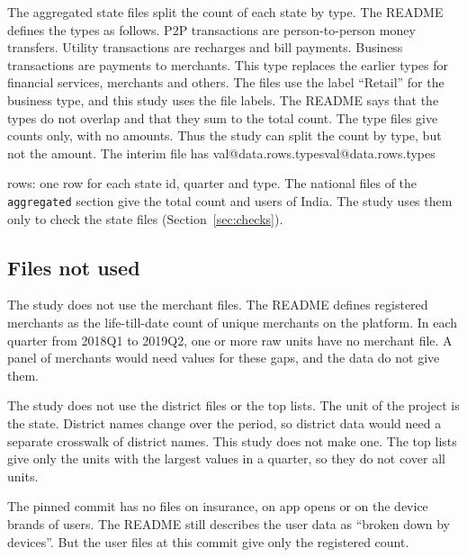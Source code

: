 \documentclass[11pt,a4paper]{article}
\makeatletter
\newcommand{\val}[1]{\ifcsname val@#1\endcsname\csname val@#1\endcsname\else
  \PackageError{study}{Unknown value key `#1'}{Run Rscript src/R/part1_study.R}\fi}
\makeatother
\begin{document}
The aggregated state files split the count of each state by type. The README defines the types as follows. P2P transactions are person-to-person money transfers. Utility transactions are recharges and bill payments. Business transactions are payments to merchants. This type replaces the earlier types for financial services, merchants and others. The files use the label ``Retail'' for the business type, and this study uses the file labels. The README says that the types do not overlap and that they sum to the total count. The type files give counts only, with no amounts. Thus the study can split the count by type, but not the amount. The interim file  has \val{data.rows.types} rows: one row for each state id, quarter and type. The national files of the \texttt{aggregated} section give the total count and users of India. The study uses them only to check the state files (Section~\ref{sec:checks}).

\subsection{Files not used}
The study does not use the merchant files. The README defines registered merchants as the life-till-date count of unique merchants on the platform. In each quarter from 2018Q1 to 2019Q2, one or more raw units have no merchant file. A panel of merchants would need values for these gaps, and the data do not give them.

The study does not use the district files or the top lists. The unit of the project is the state. District names change over the period, so district data would need a separate crosswalk of district names. This study does not make one. The top lists give only the units with the largest values in a quarter, so they do not cover all units.

The pinned commit has no files on insurance, on app opens or on the device brands of users. The README still describes the user data as ``broken down by devices''. But the user files at this commit give only the registered count.
\end{document}
